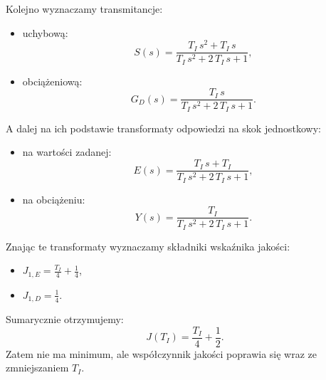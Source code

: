 \documentclass{article}
\begin{document}
    Kolejno wyznaczamy transmitancje:
    \begin{itemize}
        \item uchybową:
        $$
            S(s) = \frac{T_{I}\,s^2+T_{I}\,s}{T_{I}\,s^2+2\,T_{I}\,s+1},
        $$
        \item obciążeniową:
        $$
            G_{D}(s) = \frac{T_{I}\,s}{T_{I}\,s^2+2\,T_{I}\,s+1}.
        $$
    \end{itemize}
    A dalej na ich podstawie transformaty odpowiedzi na skok jednostkowy:
    \begin{itemize}
        \item na wartości zadanej:
        $$
            E(s) = \frac{T_{I}\,s+T_{I}}{T_{I}\,s^2+2\,T_{I}\,s+1},
        $$
        \item na obciążeniu:
        $$
            Y(s) = \frac{T_{I}}{T_{I}\,s^2+2\,T_{I}\,s+1}.
        $$
    \end{itemize}
    Znając te transformaty wyznaczamy składniki wskaźnika jakości:
    \begin{itemize}
        \item $J_{1,E} = \frac{T_{I}}{4}+\frac{1}{4}$,
        \item $J_{1,D} = \frac{1}{4}$.
    \end{itemize}
    Sumarycznie otrzymujemy:
    $$
        J(T_I) = \frac{T_{I}}{4}+\frac{1}{2}.
    $$
    Zatem nie ma minimum, ale współczynnik jakości poprawia się wraz ze zmniejszaniem $T_I$. 

    

   
\end{document}
